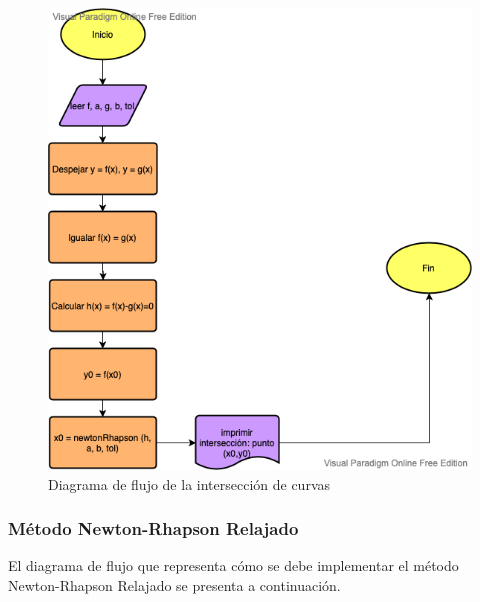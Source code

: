 \documentclass[a4paper,12pt]{article}
\begin{document}
\begin{figure}[h!]
\centering
\includegraphics[scale=0.7]{img/flujograma_interseccion.png}
\vspace{-1em}
\caption{Diagrama de flujo de la intersección de curvas}
\label{fig:flujograma_interseccion}
\end{figure}

\newpage

\subsubsection{Método Newton-Rhapson Relajado}

El diagrama de flujo que representa cómo se debe implementar el método Newton-Rhapson Relajado se presenta a continuación.
\end{document}
